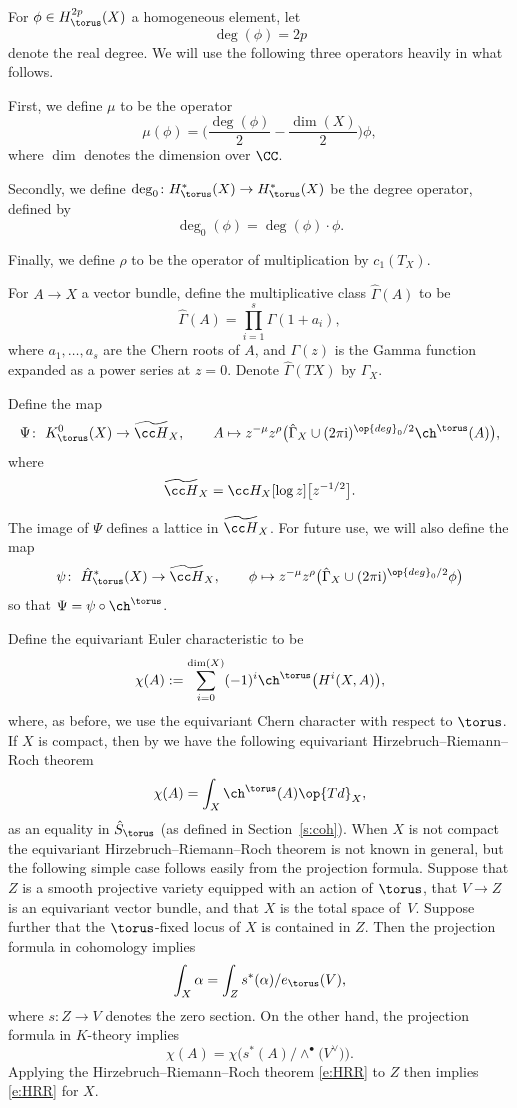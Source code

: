 For $\phi \in H^{2p}_\torus(X)$ a homogeneous element, let
\[
\deg(\phi) = 2p
\]
denote the real degree.
We will use the following three operators heavily in what follows.

First, we define $\mu$ to be the operator
\[
\mu(\phi) = \biggl(\frac{\deg(\phi)}{2} - \frac{\dim(X)}{2}\biggr)\phi,
\]
where $\dim$ denotes the dimension over $\CC$.

Secondly, we define $\deg_0\colon H^*_\torus(X) \to H^*_\torus(X)$ be the degree operator, defined by
\[
\deg_0(\phi) = \deg(\phi)\cdot \phi.
\]


Finally, we define $\rho$ to be the operator of multiplication by $c_1(T_X)$.

For $A \to X$ a vector bundle, define the multiplicative class $\hat \Gamma(A)$ to be
\[
\hat \Gamma(A) = \prod_{i=1}^s \Gamma(1 + a_i),
\]
where $a_1, \dots, a_s$ are the Chern roots of $A$, and $\Gamma(z)$ is the Gamma function expanded as a power series at $z = 0$. Denote $\hat \Gamma(TX)$ by $\hat \Gamma_{X}$.

Define the map
\begin{align*}
\Psi\colon \ K^0_\torus(X) \to \widetilde{\cc H}_X, \qquad
A \mapsto z^{- \mu} z^{\rho} \bigl( \hat \Gamma_X \cup (2 \pi {\rm i})^{\op{deg}_0/2} \ch^\torus(A) \bigr),
\end{align*}
where
\[
\widetilde{\cc H}_X = \cc H_X[\log z]\big[z^{-1/2}\big].
\]

The image of $\Psi$ defines a lattice in $\widetilde{\cc H}_X$. For future use, we will also define the map
\begin{align}
\psi\colon \ \hat H^*_\torus(X) \to \widetilde{\cc H}_X, \qquad
\phi \mapsto z^{- \mu} z^{\rho} \bigl( \hat \Gamma_X \cup (2 \pi {\rm i})^{\op{deg}_0/2} \phi \bigr)\label{psi}
\end{align}
so that $\Psi = \psi \circ \ch^\torus$.

Define the equivariant Euler characteristic to be
\[
\chi(A) := \sum_{i=0}^{\dim(X)} (-1)^i \ch^\torus\bigl(H^i(X, A)\bigr),
\]
where, as before, we use the equivariant Chern character with respect to $\torus$.
If $X$ is compact, then by \cite{EG, Thomason} we have the following equivariant Hirzebruch--Riemann--Roch theorem
\begin{equation}\label{e:HRR}\chi(A) = \int_X \ch^\torus(A) \op{Td}_X,\end{equation}
as an equality in $\hat S_\torus$ (as defined in Section~\ref{s:coh}).
 When $X$ is not compact the equivariant Hirzebruch--Riemann--Roch theorem is not known in general, but the following simple case follows easily from the projection formula.
Suppose that $Z$ is a smooth projective variety equipped with an action of $\torus$, that $V \to Z$ is an equivariant vector bundle, and that $X$ is the total space of~$V$. Suppose further that the $\torus$-fixed locus of $X$ is contained in $Z$.
Then the projection formula in cohomology implies
\[
\int_X \alpha = \int_Z s^*(\alpha)/e_\torus(V),
\]
where $s\colon Z \to V$ denotes the zero section.
On the other hand, the projection formula in $K$-theory implies
\[
\chi(A) = \chi\bigl(s^*(A)/\wedge^\bullet\bigl(V^\vee\bigr)\bigr).
\]
Applying the Hirzebruch--Riemann--Roch theorem \eqref{e:HRR} to $Z$ then implies \eqref{e:HRR} for $X$.

